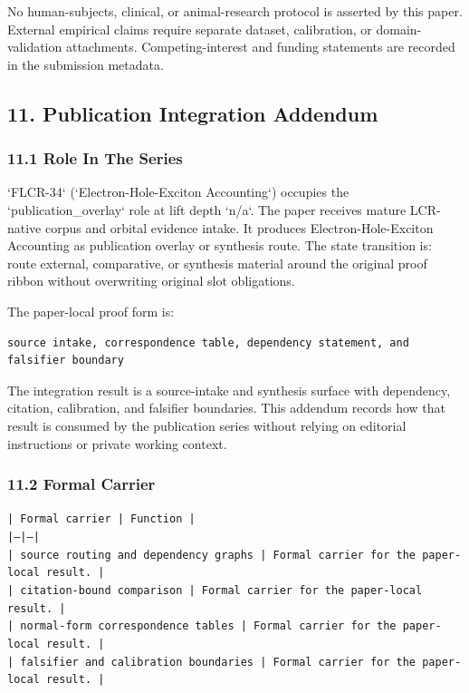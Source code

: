 \documentclass[11pt]{article}
\begin{document}
No human-subjects, clinical, or animal-research protocol is asserted by this
paper. External empirical claims require separate dataset, calibration, or
domain-validation attachments. Competing-interest and funding statements are recorded in the submission metadata.

\subsection*{11. Publication Integration Addendum}

\subsubsection*{11.1 Role In The Series}

`FLCR-34` (`Electron-Hole-Exciton Accounting`) occupies the `publication\_overlay` role at lift depth `n/a`.
The paper receives mature LCR-native corpus and orbital evidence intake. It produces Electron-Hole-Exciton Accounting as publication overlay or synthesis route. The state transition is:
route external, comparative, or synthesis material around the original proof ribbon without overwriting original slot obligations.

The paper-local proof form is:

\begin{verbatim}
source intake, correspondence table, dependency statement, and falsifier boundary
\end{verbatim}

The integration result is a source-intake and synthesis surface with dependency, citation, calibration, and falsifier boundaries. This addendum records how that result is
consumed by the publication series without relying on editorial instructions or
private working context.

\subsubsection*{11.2 Formal Carrier}

\noindent\texttt{| Formal carrier | Function |}\\
\noindent\texttt{|---|---|}\\
\noindent\texttt{| source routing and dependency graphs | Formal carrier for the paper-local result. |}\\
\noindent\texttt{| citation-bound comparison | Formal carrier for the paper-local result. |}\\
\noindent\texttt{| normal-form correspondence tables | Formal carrier for the paper-local result. |}\\
\noindent\texttt{| falsifier and calibration boundaries | Formal carrier for the paper-local result. |}\\
\end{document}

